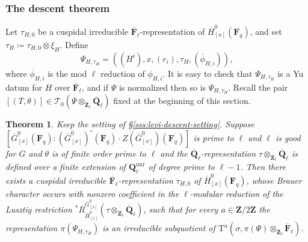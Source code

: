 \documentclass[reqno]{amsart}
\numberwithin{equation}{subsection}
\newcommand{\F}{\mathbf{F}}
\newcommand{\Q}{\mathbf{Q}}
\newcommand{\Z}{\mathbf{Z}}
\newcommand{\ol}[1]{\overline{#1}}
\newcommand\cT{\mathcal{T}}
\DeclareMathOperator{\unr}{unr}
\newcommand{\rT}{\ensuremath{\mathrm{T}}\xspace}
\newtheorem{thm}{Theorem}[subsection]
\theoremstyle{remark}
\numberwithin{equation}{subsection}
\numberwithin{figure}{subsection}
\begin{document}
\subsubsection{The descent theorem}

Let $\tau_{H,0}$ be a cuspidal irreducible $\ol\F_\ell$-representation of $\ol H^0_{[x]}(\F_q)$, and set $\tau_H \coloneqq \tau_{H,0}\otimes\xi_H$. Define
\begin{equation}\label{eq:levi-Psi-H}
\Psi_{H, \tau_H} = ((H^i), x, (r_i), \tau_H, (\ol \phi_{H,i})),
\end{equation}
where $\ol\phi_{H,i}$ is the mod $\ell$ reduction of $\phi_{H,i}$. It is easy to check that $\Psi_{H,\tau_H}$ is a Yu datum for $H$ over $\ol\F_\ell$, and if $\Psi$ is normalized then so is $\Psi_{H,\tau_H}$. Recall the pair $[(T,\theta)] \in \cT_0(\Psi \otimes_{\ol\Z_\ell} \ol\Q_\ell)$ fixed at the beginning of this section.

\begin{thm}\label{thm:yu-datum-dl-res}
Keep the setting of \S\ref{sss:levi-descent-setting}. Suppose $[\ol G^0_{[x]}(\F_q): (\ol G^0_{[x]})^\circ(\F_q) \cdot Z(\ol G_{[x]}^0)(\F_q)]$ is prime to $\ell$ and $\ell$ is good for $G$ and $\theta$ is of finite order prime to $\ell$ and the $\ol\Q_\ell$-representation $\tau \otimes_{\ol\Z_\ell} \ol\Q_\ell$ is defined over a finite extension of $\Q_\ell^{\unr}$ of degree prime to $\ell-1$.
Then there exists a cuspidal irreducible $\ol\F_\ell$-representation $\tau_{H,0}$ of $\ol H^0_{[x]}(\F_q)$, whose Brauer character occurs with nonzero coefficient in the $\ell$-modular reduction of the Lusztig restriction ${}^*R^{\ol G^0_{[x]}}_{\ol H^0_{[x]}}(\tau\otimes_{\ol\Z_\ell}\ol\Q_\ell)$, such that for every $a \in \Z/2\Z$ the representation $\pi(\Psi_{H,\tau_H})$ is an irreducible subquotient of $\rT^a(\sigma, \pi(\Psi) \otimes_{\ol\Z_\ell} \ol\F_\ell)$.
\end{thm}
\end{document}
